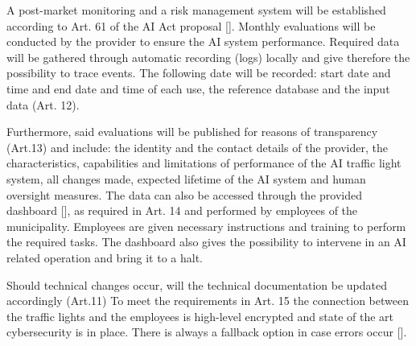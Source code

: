   A post-market monitoring and a risk management system will be established according to Art. 61 of the AI Act proposal [\citet{ai_act}].
Monthly evaluations will be conducted by the provider to ensure the AI system performance. Required data will be gathered through automatic recording (logs) locally and give therefore the possibility to trace events. The following date will be recorded: start date and time and end date and time of each use, the reference database and the input data (Art. 12). 

Furthermore, said evaluations will be published for reasons of transparency (Art.13) and include: the identity and the contact details of the provider, the characteristics, capabilities and limitations of performance of the AI traffic light system, all changes made, expected lifetime of the AI system and human oversight measures.
The data can also be accessed through the provided dashboard [\citet{KI4LSA_presentation}], as required in Art. 14 and performed by employees of the municipality. Employees are given necessary instructions and training to perform the required tasks. The dashboard also gives the possibility to intervene in an AI related operation and bring it to a halt.

Should technical changes occur, will the technical documentation  be updated accordingly (Art.11) To meet the requirements in Art. 15 the connection between the traffic lights and the employees is high-level encrypted and state of the art cybersecurity is in place. There is always a fallback option in case errors occur [\citet{seick}].
